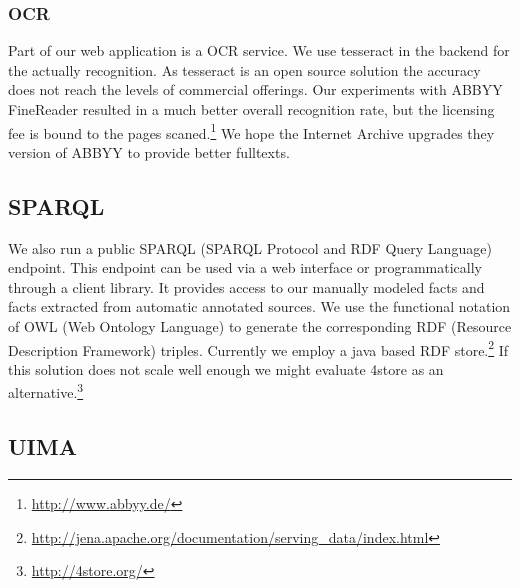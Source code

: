 \documentclass[12pt, draft]{article}
\begin{document}
\subsubsection{OCR}

Part of our web application is a OCR service.  We use tesseract in the backend for the
actually recognition.  As tesseract is an open source solution the accuracy does not
reach the levels of commercial offerings.  Our experiments with ABBYY FineReader
resulted in a much better overall recognition rate, but the licensing fee is bound
to the pages scaned.\footnote{\url{http://www.abbyy.de/}}
We hope the Internet Archive upgrades they version of ABBYY to provide better fulltexts.

\subsection{SPARQL}

We also run a public SPARQL (SPARQL Protocol and RDF Query Language) endpoint.
This endpoint can be used via a web interface or programmatically through
a client library.  It provides access to our manually modeled facts
and facts extracted from automatic annotated sources.
We use the functional notation of OWL (Web Ontology Language) to generate
the corresponding RDF (Resource Description Framework) triples.
Currently we employ a java based RDF store.\footnote{\url{http://jena.apache.org/documentation/serving_data/index.html}}
If this solution does not scale well enough we might evaluate
4store as an alternative.\footnote{\url{http://4store.org/}}

\subsection{UIMA}
\end{document}
